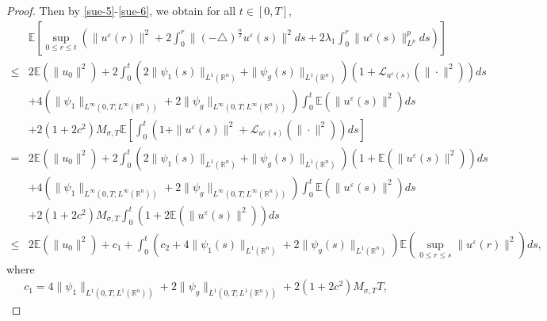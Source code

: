 \documentclass[11pt]{article}
\numberwithin{equation}{section}
\theoremstyle{plain}
\def\leq{\leqslant}
\begin{document}
\begin{proof}
 Then by \eqref{sue-5}-\eqref{sue-6}, we obtain
 for all $t\in [0,T]$,
 \begin{align}\label{sue-7}
    & \mathbb{E} \left [ \sup_{0 \leq r\leq t}
    \left (\| u^\varepsilon(r) \|^2
    + 2 \int_0^r \| (-\triangle)^{\frac{\alpha}{2}} u^\varepsilon(s) \|^2 ds
    +2 \lambda_1 \int_0^r \| u^\varepsilon (s) \|^p_{L^p} ds
    \right )
    \right ] \nonumber \\
    \leq &
 2  \mathbb{E} \left (\| u_0 \|^2
    \right )
    + 2 \int_0^t
    ( 2\| \psi_1(s) \|_{L^1(\mathbb{R}^n)}
    +\| \psi_g(s) \|_{L^1(\mathbb{R}^n)}
    )
    \left( 1 + \mathcal{L}_{u^\varepsilon(s)}
    (\|\cdot\|^2) \right) ds  \nonumber \\
    &
    +  4 \left(
    \|\psi_1\|_{L^\infty(0,T; L^\infty(\mathbb{R}^n))}
    + 2 \|\psi_g\|_{L^\infty(0,T; L^\infty(\mathbb{R}^n))} \right) \int_0^t
    \mathbb{E} \left (
    \| u^\varepsilon(s) \|^2
    \right )  ds  \nonumber \\
    &
    + 2(1+2c^2) M_{\sigma,T}
    \mathbb{E}
    \left[ \int_0^t
    \left( 1 + \|u^\varepsilon(s)\|^2
    + \mathcal{L}_{u^\varepsilon(s)}(\|\cdot\|^2)
    \right)
    ds
    \right]
     \nonumber \\
    = &
    2   \mathbb{E} \left (\| u_0 \|^2
    \right )
    + 2 \int_0^t
    ( 2\| \psi_1(s) \|_{L^1(\mathbb{R}^n)}
    +\| \psi_g(s) \|_{L^1(\mathbb{R}^n)}
    )
    \left( 1 +
        \mathbb{E} \left (
    \| u^\varepsilon(s) \|^2
    \right )
     \right) ds  \nonumber \\
    &
    +  4 \left(
    \|\psi_1\|_{L^\infty(0,T; L^\infty(\mathbb{R}^n))}
    + 2 \|\psi_g\|_{L^\infty(0,T; L^\infty(\mathbb{R}^n))} \right) \int_0^t
    \mathbb{E} \left (
    \| u^\varepsilon(s) \|^2
    \right )  ds  \nonumber \\
    &
    + 2(1+2c^2) M_{\sigma,T}
      \int_0^t
    \left( 1 + 2
    \mathbb{E} (
    \|u^\varepsilon(s)\|^2
    )
    \right)
    ds
    \nonumber \\
    \le  &
    2   \mathbb{E} \left (\| u_0 \|^2
    \right )
    +c_1
    +  \int_0^t
    (c_2+  4\| \psi_1(s) \|_{L^1(\mathbb{R}^n)}
    +2\| \psi_g(s) \|_{L^1(\mathbb{R}^n)}
    )
    \mathbb{E} \left (
    \sup_{0\le r\le s}
    \| u^\varepsilon(r) \|^2
    \right) ds  ,
 \end{align}
 where
  \begin{align*}
 c_1 =   4 \| \psi_1 \|_{L^1(0,T; L^1(\mathbb{R}^n) ) }
         + 2 \| \psi_g \|_{L^1(0,T; L^1(\mathbb{R}^n) ) }
          + 2(1+2c^2) M_{\sigma,T}T,
 \end{align*}

\end{proof}
\end{document}
